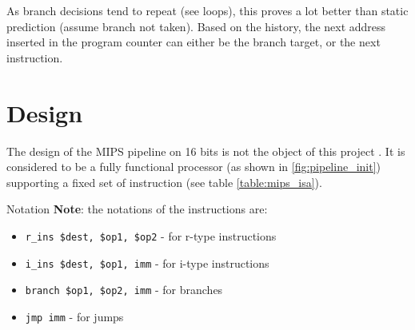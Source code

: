 \documentclass[a4paper,12pt]{report}
\begin{document}
As branch decisions tend to repeat (see loops), this proves a lot better than static prediction (assume branch not taken). Based on the history, the next address inserted in the program counter can either be the branch target, or the next instruction.

\chapter{Design}

The design of the MIPS pipeline on 16 bits is not the object of this project . It is considered to be a fully functional processor (as shown in \ref{fig:pipeline_init}) supporting a fixed set of instruction (see table \ref{table:mips_isa}).

\begin{remark}{Notation}
    \textbf{Note}: the notations of the instructions are:
    \begin{itemize}
        \item \verb|r_ins $dest, $op1, $op2| - for r-type instructions
        \item \verb|i_ins $dest, $op1, imm| - for i-type instructions
        \item \verb|branch $op1, $op2, imm| - for branches
        \item \verb|jmp imm| - for jumps
    \end{itemize}
\end{remark}
\end{document}
